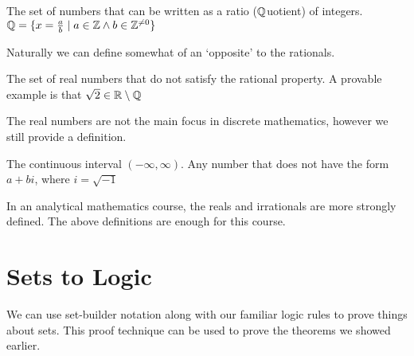 \documentclass[main.tex]{subfiles}
\begin{document}
\begin{defn}
	The set of numbers that can be written as a ratio (\(\mathbb{Q}\)uotient) of integers. \(\mathbb{Q} = \{x = \frac{a}{b} \mid a \in \mathbb{Z} \land b \in \mathbb{Z}^{\neq 0}\}\)
\end{defn}

Naturally we can define somewhat of an `opposite' to the rationals.

\begin{defn}
	The set of real numbers that do not satisfy the rational property. A provable example is that \(\sqrt{2} \in \mathbb{R} \setminus \mathbb{Q}\)
\end{defn}

The real numbers are not the main focus in discrete mathematics, however we still provide a definition.

\begin{defn}
	The continuous interval \((-\infty, \infty)\). Any number that does not have the form \(a+bi\), where \(i = \sqrt{-1}\)
\end{defn}

In an analytical mathematics course, the reals and irrationals are more strongly defined. The above definitions are enough for this course.

\section{Sets to Logic}

We can use set-builder notation along with our familiar logic rules to prove things about sets. This proof technique can be used to prove the theorems we showed earlier.


\end{document}

